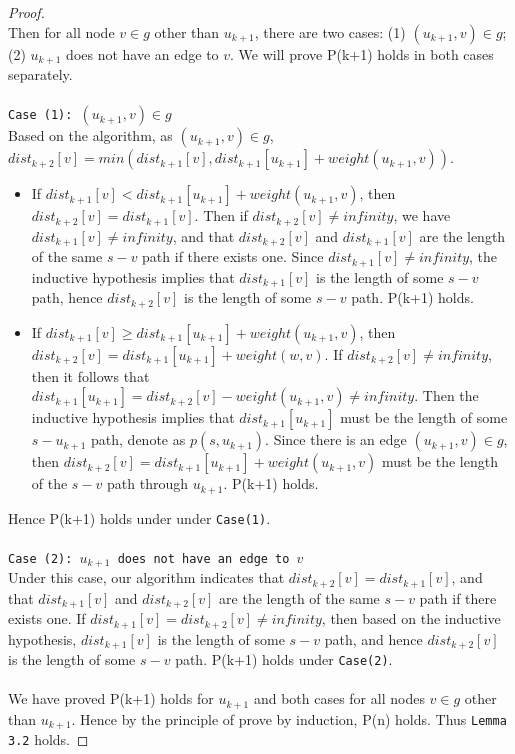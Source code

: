 \documentclass[11pt, oneside]{article}   	%
\newcommand\tab[1][1cm]{\hspace*{#1}}
\theoremstyle{definition}
\begin{document}
\begin{proof}
\\
Then for all node $v \in g$ other than $u_{k+1}$, there are two cases: (1) $(u_{k+1}, v) \in g$; (2) $u_{k+1}$ does not have an edge to $v$. We will prove P(k+1) holds in both cases separately. 
\\\\
\texttt{Case (1): $(u_{k+1}, v) \in g$}
\\
Based on the algorithm, as $(u_{k+1}, v) \in g$, $dist_{k+2}[v] = min(dist_{k+1}[v], dist_{k+1}[u_{k+1}] + weight(u_{k+1}, v))$. 
\begin{itemize}
  \item If $dist_{k+1}[v] < dist_{k+1}[u_{k+1}] + weight(u_{k+1}, v)$, then $dist_{k+2}[v] = dist_{k+1}[v]$. Then if $dist_{k+2}[v] \neq infinity$, we have $dist_{k+1}[v] \neq infinity$, and that $dist_{k+2}[v]$ and $dist_{k+1}[v]$ are the length of the same $s-v$ path if there exists one. Since $dist_{k+1}[v] \neq infinity$, the inductive hypothesis implies that $dist_{k+1}[v]$ is the length of some $s-v$ path, hence $dist_{k+2}[v]$ is the length of some $s-v$ path. P(k+1) holds. 

  \item If $dist_{k+1}[v] \geq dist_{k+1}[u_{k+1}] + weight(u_{k+1}, v)$, then $dist_{k+2}[v] = dist_{k+1}[u_{k+1}] + weight(w, v)$. If $dist_{k+2}[v] \neq infinity$, then it follows that $dist_{k+1}[u_{k+1}] = dist_{k+2}[v] - weight(u_{k+1}, v) \neq infinity$. Then the inductive hypothesis implies that $dist_{k+1}[u_{k+1}]$ must be the length of some $s-u_{k+1}$ path, denote as $p(s, u_{k+1})$. Since there is an edge $(u_{k+1}, v) \in g$, then $dist_{k+2}[v] = dist_{k+1}[u_{k+1}] + weight(u_{k+1}, v)$ must be the length of the $s-v$ path through $u_{k+1}$. P(k+1) holds. 
\end{itemize}
Hence P(k+1) holds under under \texttt{Case(1)}. 
\\\\
\texttt{Case (2): $u_{k+1}$ does not have an edge to $v$}
\\
Under this case, our algorithm indicates that $dist_{k+2}[v] = dist_{k+1}[v]$, and that $dist_{k+1}[v]$ and $dist_{k+2}[v]$ are the length of the same $s-v$ path if there exists one. If $dist_{k+1}[v] = dist_{k+2}[v] \neq infinity$, then based on the inductive hypothesis, $dist_{k+1}[v]$ is the length of some $s-v$ path, and hence $dist_{k+2}[v]$ is the length of some $s-v$ path. P(k+1) holds under \texttt{Case(2)}. 
\\\\
We have proved P(k+1) holds for $u_{k+1}$ and both cases for all nodes $v \in g$ other than $u_{k+1}$. Hence by the principle of prove by induction, P(n) holds. Thus \texttt{\texttt{Lemma 3.2}} holds. 
\end{proof}
\tab\\ 
\end{document}
